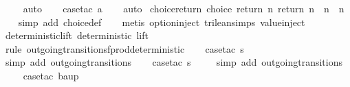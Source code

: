 \begin{isabellebody}
\ \ \ \isamarkupfalse%
\ auto{\isacharbrackleft}{}{\isacharbrackright}\isanewline
\ \ \isamarkupfalse%
\ {\isacharparenleft}case{\isacharunderscore}tac\ {\isachardoublequoteopen}a{\isacharequal}{}{\isachardoublequoteclose}{\isacharparenright}\isanewline
\ \ \isamarkupfalse%
\ auto%
\endisatagproof
{\isafoldproof}%
%
\isadelimproof
\isanewline
%
\endisadelimproof
\isanewline
{}\isamarkupfalse%
\ choice{\isacharunderscore}return{\isacharcolon}\ {\isachardoublequoteopen}choice\ {\isacharparenleft}return\ n{\isacharparenright}\ {\isacharparenleft}return\ n{\isacharprime}{\isacharparenright}\ {\isasymLongrightarrow}\ n\ {\isacharequal}\ n{\isacharprime}{\isachardoublequoteclose}\isanewline
%
\isadelimproof
\ \ %
\endisadelimproof
%
\isatagproof
{}\isamarkupfalse%
\ {\isacharparenleft}simp\ add{\isacharcolon}\ choice{\isacharunderscore}def{\isacharparenright}\isanewline
\ \ \isamarkupfalse%
\ {\isacharparenleft}metis\ option{\isachardot}inject\ trilean{\isachardot}simps{\isacharparenleft}{}{\isacharparenright}\ value{\isachardot}inject{\isacharparenleft}{}{\isacharparenright}{\isacharparenright}%
\endisatagproof
{\isafoldproof}%
%
\isadelimproof
\isanewline
%
\endisadelimproof
\isanewline
{}\isamarkupfalse%
\ deterministic{\isacharunderscore}lift{\isacharcolon}\ {\isachardoublequoteopen}deterministic\ lift{\isachardoublequoteclose}\isanewline
%
\isadelimproof
\ \ %
\endisadelimproof
%
\isatagproof
{}\isamarkupfalse%
\ {\isacharparenleft}rule\ outgoing{\isacharunderscore}transitions{\isacharunderscore}fprod{\isacharunderscore}deterministic{\isacharparenright}\isanewline
\ \ \isamarkupfalse%
\ {\isacharparenleft}case{\isacharunderscore}tac\ {\isachardoublequoteopen}s{\isacharequal}{}{\isachardoublequoteclose}{\isacharparenright}\isanewline
\ \ \ \isamarkupfalse%
\ {\isacharparenleft}simp\ add{\isacharcolon}\ outgoing{\isacharunderscore}transitions{\isacharunderscore}{}{\isacharparenright}\isanewline
\ \ \isamarkupfalse%
\ {\isacharparenleft}case{\isacharunderscore}tac\ {\isachardoublequoteopen}s{\isacharequal}{}{\isachardoublequoteclose}{\isacharparenright}\isanewline
\ \ \ \isamarkupfalse%
\ {\isacharparenleft}simp\ add{\isacharcolon}\ outgoing{\isacharunderscore}transitions{\isacharunderscore}{}{\isacharparenright}\isanewline
\ \ \ \isamarkupfalse%
\ {\isacharparenleft}case{\isacharunderscore}tac\ {\isachardoublequoteopen}ba{\isacharequal}up{}{}{\isachardoublequoteclose}{\isacharparenright}\isanewline

\end{isabellebody}
